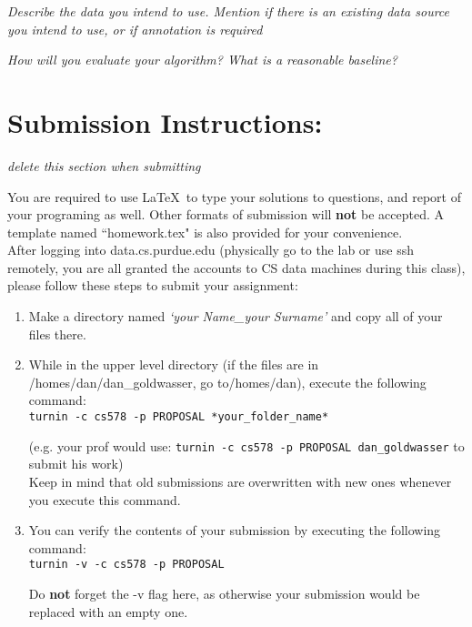 \documentclass[11pt]{article}
\begin{document}
\textit{Describe the data you intend to use. Mention if there is an existing data source you intend to use, or if annotation is required}

\textit{How will you evaluate your algorithm? What is a reasonable baseline?}



\section*{Submission Instructions:} 
\textit{delete this section when submitting}

You are required to use \LaTeX \, to type your solutions to questions, and report of your programing as well. Other formats of submission will \textbf{not} be accepted. A template named ``homework.tex" is also provided for your convenience.\\

After logging into data.cs.purdue.edu (physically go to the lab or use ssh remotely, you are all granted the accounts to CS data machines during this class), please follow these steps to submit your assignment:
\begin{enumerate}
	\item Make a directory named \textit{`your Name\_your Surname'} and copy all of your files there.
	\item While in the upper level directory (if the files are in /homes/dan/dan\_goldwasser, go to/homes/dan), execute the following command:\\

	\texttt{turnin -c cs578 -p PROPOSAL *your\_folder\_name*}
		
	(e.g. your prof would use: \texttt{turnin -c cs578 -p PROPOSAL dan\_goldwasser} to submit his work)\\
		
	Keep in mind that old submissions are overwritten with new ones whenever you execute this
command.\\

	\item You can verify the contents of your submission by executing the following command:\\
	
	\texttt{turnin -v -c cs578 -p PROPOSAL\\}

	Do \textbf{not} forget the -v flag here, as otherwise your submission would be replaced with an empty
one.
\end{enumerate}

%
%
\end{document}
